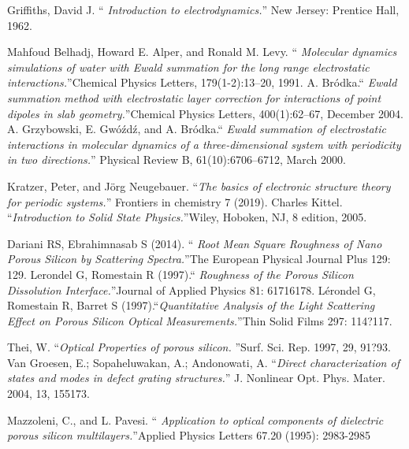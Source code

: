 \documentclass{article}
\begin{document}
\begin{thebibliography}{X}
Griffiths, David J. \textquotedblleft
\emph{Introduction to electrodynamics.}\textquotedblright
 New Jersey: Prentice Hall, 1962.

  Mahfoud Belhadj, Howard E. Alper, and Ronald M. Levy. \textquotedblleft
 \emph{ Molecular dynamics simulations of water with Ewald summation
 	for the long range electrostatic interactions.}\textquotedblright Chemical
  Physics Letters, 179(1-2):13–20, 1991.
   A. Bródka.\textquotedblleft
   \emph{ Ewald summation method with electrostatic layer correction for
  interactions of point dipoles in slab geometry.}\textquotedblright Chemical
Physics Letters, 400(1):62–67, December 2004.
  A. Grzybowski, E. Gwóźdź, and A. Bródka.\textquotedblleft
 \emph{ Ewald summation of electrostatic interactions in molecular dynamics
 	 of a three-dimensional system with periodicity in two directions.}\textquotedblright
  Physical Review B, 61(10):6706–6712, March 2000.

  Kratzer, Peter, and Jörg Neugebauer. \textquotedblleft \emph{The basics of
 	electronic structure theory for periodic systems.}\textquotedblright
  Frontiers in chemistry 7 (2019).
  Charles Kittel. \textquotedblleft \emph{Introduction to Solid State
 	 Physics.}\textquotedblright Wiley, Hoboken, NJ, 8 edition, 2005.




 Dariani RS, Ebrahimnasab S (2014). \textquotedblleft
  \emph{Root Mean Square Roughness of Nano Porous Silicon by
    Scattering Spectra.}\textquotedblright The
  European Physical Journal Plus 129: 129.
 Lerondel G, Romestain R (1997).\textquotedblleft
  \emph{Roughness of the Porous Silicon Dissolution
    Interface.}\textquotedblright Journal of Applied Physics 81:
  61716178.
 Lérondel G, Romestain R, Barret S
  (1997).\textquotedblleft \emph{Quantitative Analysis of the Light
    Scattering Effect on Porous Silicon
    Optical Measurements.}\textquotedblright Thin Solid Films 297:
  114?117.

 Thei, W. \textquotedblleft \emph{Optical Properties of porous silicon.}
\textquotedblright Surf. Sci. Rep. 1997, 29, 91?93.
 Van Groesen, E.; Sopaheluwakan, A.; Andonowati,
  A. \textquotedblleft  \emph{Direct characterization of states and
    modes in defect grating structures.}\textquotedblright
  J. Nonlinear Opt. Phys. Mater. 2004, 13, 155173.

 Mazzoleni, C., and L. Pavesi. \textquotedblleft
  \emph{Application to optical components of dielectric porous silicon
    multilayers.}\textquotedblright Applied Physics Letters 67.20
  (1995): 2983-2985

\end{thebibliography}
\end{document}
